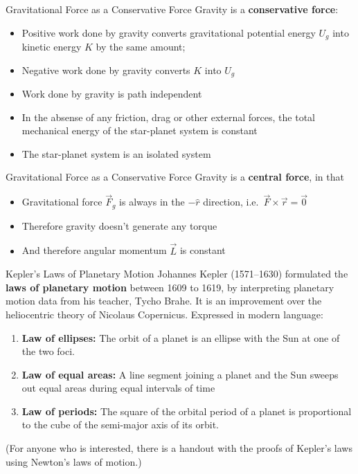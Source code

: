 \documentclass[12pt,compress,aspectratio=169]{beamer}
\begin{document}
\begin{frame}{Gravitational Force as a Conservative Force}
  Gravity is a \textbf{conservative force}:
  \begin{itemize}
  \item Positive work done by gravity converts gravitational potential energy
    $U_g$ into kinetic energy $K$ by the same amount;
  \item Negative work done by gravity converts $K$ into $U_g$
  \item Work done by gravity is path independent
  \item In the absense of any friction, drag or other external forces, the
    total mechanical energy of the star-planet system is constant
  \item The star-planet system is an isolated system
  \end{itemize}
\end{frame}



\begin{frame}{Gravitational Force as a Conservative Force}
  Gravity is a \textbf{central force}, in that
  \begin{itemize}
  \item Gravitational force $\vec F_g$ is always in the $-\hat r$ direction,
    i.e.\ $\vec F\times\vec r=\vec 0$
  \item Therefore gravity doesn't generate any torque
  \item And therefore angular momentum $\vec L$ is constant
  \end{itemize}
\end{frame}




\begin{frame}{Kepler's Laws of Planetary Motion}
  Johannes Kepler (1571--1630) formulated the \textbf{laws of planetary motion}
  between 1609 to 1619, by interpreting planetary motion data from his teacher,
  Tycho Brahe. It is an improvement over the heliocentric theory of Nicolaus
  Copernicus. Expressed in modern language:
  \begin{enumerate}
  \item\textbf{Law of ellipses:} The orbit of a planet is an ellipse with the
    Sun at one of the two foci.
  \item\textbf{Law of equal areas:} A line segment joining a planet and the Sun
    sweeps out equal areas during equal intervals of time
  \item \textbf{Law of periods:} The square of the orbital period of a planet
    is proportional to the cube of the semi-major axis of its orbit.
  \end{enumerate}
  (For anyone who is interested, there is a handout with the proofs of Kepler's
  laws using Newton's laws of motion.)
\end{frame}
\end{document}
